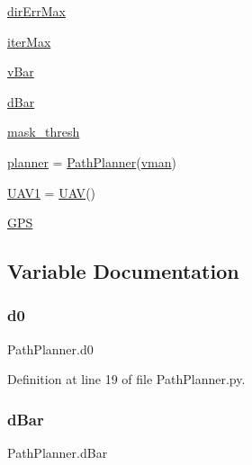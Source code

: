 \begin{DoxyCompactItemize}
\item 
\mbox{\hyperlink{namespace_path_planner_a10896abef60181bc799dc6116c64e1de}{dir\+Err\+Max}}
\item 
\mbox{\hyperlink{namespace_path_planner_a3ca749ff6a20c496bffad71e3e58cc06}{iter\+Max}}
\item 
\mbox{\hyperlink{namespace_path_planner_a27f9a6b6d62bc8155e8fe2c5d247759f}{v\+Bar}}
\item 
\mbox{\hyperlink{namespace_path_planner_a3dac24568f6bc417a8b1dc9e072bf6c6}{d\+Bar}}
\item 
\mbox{\hyperlink{namespace_path_planner_ac923de4a9571b4f7df3ce753108c1fd1}{mask\+\_\+thresh}}
\item 
\mbox{\hyperlink{namespace_path_planner_a70f6ef5b1c5da8902eb5038847427be6}{planner}} = \mbox{\hyperlink{classpath_plan_1_1_path_planner}{Path\+Planner}}(\mbox{\hyperlink{namespace_path_planner_aeb46822ede819d38fe65ab788c4db880}{vman}})
\item 
\mbox{\hyperlink{namespace_path_planner_a2aedcc016952497246f4666ce4e03505}{U\+A\+V1}} = \mbox{\hyperlink{classpath_plan_1_1_u_a_v}{U\+AV}}()
\item 
\mbox{\hyperlink{namespace_path_planner_ac365b9d675016efac5c3a1055b6bd551}{G\+PS}}
\end{DoxyCompactItemize}


\subsection{Variable Documentation}
\mbox{\label{namespace_path_planner_a447a1bffbd5244323bdbce245b375436}} 
\subsubsection{\texorpdfstring{d0}{d0}}
{\footnotesize\ttfamily Path\+Planner.\+d0}



Definition at line 19 of file Path\+Planner.\+py.

\mbox{\label{namespace_path_planner_a3dac24568f6bc417a8b1dc9e072bf6c6}} 
\subsubsection{\texorpdfstring{d\+Bar}{dBar}}
{\footnotesize\ttfamily Path\+Planner.\+d\+Bar}



